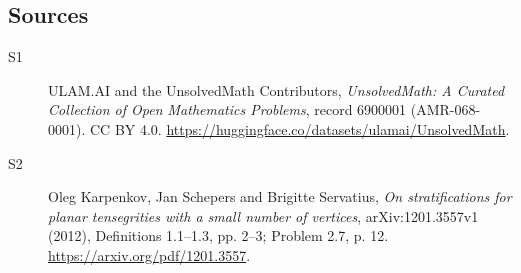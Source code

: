 \documentclass[11pt]{article}
\begin{document}
\subsection{Sources}
\begin{description}
\item[\hypertarget{source:6900001:1}{S1}] ULAM.AI and the UnsolvedMath Contributors, \emph{UnsolvedMath: A Curated Collection of Open Mathematics Problems}, record 6900001 (AMR-068-0001). CC BY 4.0. \url{https://huggingface.co/datasets/ulamai/UnsolvedMath}.
\item[\hypertarget{source:6900001:2}{S2}] Oleg Karpenkov, Jan Schepers and Brigitte Servatius, \emph{On stratifications for planar tensegrities with a small number of vertices}, arXiv:1201.3557v1 (2012), Definitions 1.1--1.3, pp. 2--3; Problem 2.7, p. 12. \url{https://arxiv.org/pdf/1201.3557}.
\end{description}
\label{end:6900001}
\end{document}

